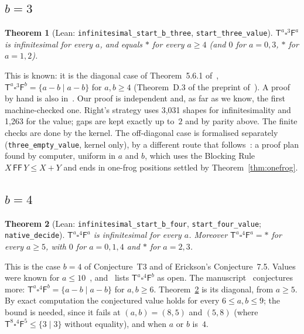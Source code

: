 \documentclass[11pt,a4paper]{article}
\newcommand{\Tt}{\mathsf{T}}
\newcommand{\Ff}{\mathsf{F}}
\newcommand{\E}{\square}
\newcommand{\lean}[1]{\texttt{#1}}
\theoremstyle{plain}
\newtheorem{theorem}{Theorem}
\theoremstyle{remark}
\begin{document}
\subsection{\texorpdfstring{$b=3$}{b=3}}

\begin{theorem}[Lean: \lean{infinitesimal\_start\_b\_three}, \lean{start\_three\_value}]
$\Tt^a\E^3\Ff^a$ is infinitesimal for every $a$, and equals $\ast$ for every $a\ge4$ (and $0$ for
$a=0,3$, $\ast$ for $a=1,2$).
\end{theorem}

This is known: it is the diagonal case of Theorem~5.6.1 of~\cite{Th08},
$\Tt^a\E^3\Ff^b=\{a-b\mid a-b\}$ for $a,b\ge4$ (Theorem~D.3 of the preprint of~\cite{T11}). A proof
by hand is also in~\cite{T11b}. Our proof
is independent and, as far as we know, the first machine-checked one. Right's strategy uses 3,031
shapes for infinitesimality and 1,263 for the value; gaps are kept exactly up to~$2$ and by parity
above. The finite checks are done by the kernel. The off-diagonal case is formalised separately
(\lean{three\_empty\_value}, kernel only), by a different route that follows~\cite{T11b}: a
proof plan found by computer, uniform in $a$ and $b$, which uses the Blocking Rule
$X\,\Ff\Ff\,Y\le X+Y$ and ends in one-frog positions settled by Theorem~\ref{thm:onefrog}.

\subsection{\texorpdfstring{$b=4$}{b=4}}

\begin{theorem}[Lean: \lean{infinitesimal\_start\_b\_four}, \lean{start\_four\_value};
\lean{native\_decide}]\label{thm:b4}
$\Tt^a\E^4\Ff^a$ is infinitesimal for every $a$. Moreover $\Tt^a\E^4\Ff^a=\ast$ for every
$a\ge5$, with $0$ for $a=0,1,4$ and $\ast$ for $a=2,3$.
\end{theorem}

This is the case $b=4$ of Conjecture~T3 and of Erickson's Conjecture~7.5. Values were known for
$a\le10$~\cite{T11}, and~\cite[p.~89]{Th08} lists $\Tt^a\E^4\Ff^b$ as open.
The manuscript~\cite{T11b} conjectures more: $\Tt^a\E^4\Ff^b=\{a-b\mid a-b\}$ for $a,b\ge6$.
Theorem~\ref{thm:b4} is its diagonal, from $a\ge5$. By exact computation the conjectured value
holds for every $6\le a,b\le9$; the bound is needed, since it fails at $(a,b)=(8,5)$ and $(5,8)$
(where $\Tt^8\E^4\Ff^5\le\{3\mid3\}$ without equality), and when $a$ or $b$ is~$4$.
\end{document}
